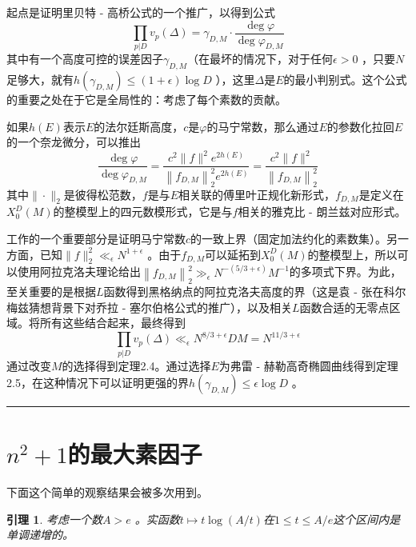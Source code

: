 \documentclass{article}
\newtheorem{lemma}{引理}
\begin{document}
起点是证明里贝特 - 高桥公式\cite{8}的一个推广，以得到公式
\[\prod_{p | D} v_{p}(\Delta)=\gamma_{D,M} \cdot \frac{\deg \varphi}{\deg \varphi_{D,M}}\]
其中有一个高度可控的误差因子\(\gamma_{D,M}\)（在最坏的情况下，对于任何\(\epsilon>0\) ，只要\(N\)足够大，就有\(h(\gamma_{D,M}) \leq (1+\epsilon) \log D\) ），这里\(\Delta\)是\(E\)的最小判别式。这个公式的重要之处在于它是全局性的：考虑了每个素数的贡献。


如果\(h(E)\)表示\(E\)的法尔廷斯高度，\(c\)是\(\varphi\)的马宁常数，那么通过\(E\)的参数化拉回\(E\)的一个奈龙微分，可以推出
\[\frac{\deg \varphi}{\deg \varphi_{D,M}}=\frac{c^{2}\| f\| ^{2} e^{2 h(E)}}{\left\| f_{D,M}\right\| _{2}^{2} e^{2 h(E)}}=\frac{c^{2}\| f\| ^{2}}{\left\| f_{D,M}\right\| _{2}^{2}}\]
其中\(\|\cdot\|_{2}\)是彼得松范数，\(f\)是与\(E\)相关联的傅里叶正规化新形式，\(f_{D,M}\)是定义在\(X_{0}^{D}(M)\)的整模型上的四元数模形式，它是与\(f\)相关的雅克比 - 朗兰兹对应形式。


工作的一个重要部分是证明马宁常数\(c\)的一致上界（固定加法约化的素数集）。另一方面，已知\(\|f\|_{2}^{2} \ll_{\epsilon} N^{1+\epsilon}\) \cite{4}。由于\(f_{D,M}\)可以延拓到\(X_{0}^{D}(M)\)的整模型上，所以可以使用阿拉克洛夫理论给出\(\left\|f_{D,M}\right\|_{2}^{2} \gg_{\epsilon} N^{-(5 / 3+\epsilon)} M^{-1}\)的多项式下界。为此，至关重要的是根据\(L\)函数得到黑格纳点的阿拉克洛夫高度的界（这是袁 - 张在科尔梅兹猜想背景下对乔拉 - 塞尔伯格公式的推广\cite{17}），以及相关\(L\)函数合适的无零点区域。将所有这些结合起来，最终得到
\[\prod_{p | D} v_{p}(\Delta) \ll_{\epsilon} N^{8 / 3+\epsilon} D M=N^{11 / 3+\epsilon}\]
通过改变\(M\)的选择得到定理2.4。通过选择\(E\)为弗雷 - 赫勒高奇椭圆曲线得到定理2.5，在这种情况下可以证明更强的界\(h(\gamma_{D,M}) \leq \epsilon \log D\) 。

\newpage
\hrule
\part{\(n^{2}+1\)的最大素因子}

下面这个简单的观察结果会被多次用到。

\setcounter{lemma}{0}
\renewcommand{\thelemma}{3.\arabic{lemma}}
\begin{lemma}
考虑一个数\(A>e\) 。实函数\(t \mapsto t \log (A / t)\)在\(1 \leq t \leq A / e\)这个区间内是单调递增的。
\end{lemma}
\end{document}
